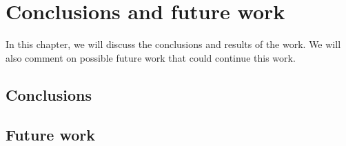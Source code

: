 \chapter{Conclusions and future work}
In this chapter, we will discuss the conclusions and results of the work. We will also comment on possible future work that could continue this work.
\section{Conclusions}
\section{Future work}